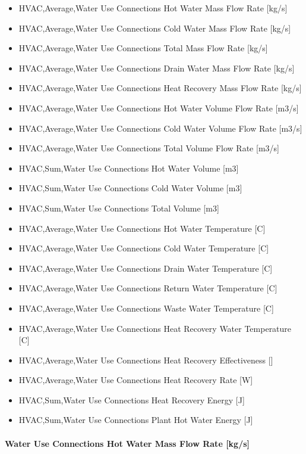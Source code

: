 \begin{itemize}
\item
  HVAC,Average,Water Use Connections Hot Water Mass Flow Rate {[}kg/s{]}
\item
  HVAC,Average,Water Use Connections Cold Water Mass Flow Rate {[}kg/s{]}
\item
  HVAC,Average,Water Use Connections Total Mass Flow Rate {[}kg/s{]}
\item
  HVAC,Average,Water Use Connections Drain Water Mass Flow Rate {[}kg/s{]}
\item
  HVAC,Average,Water Use Connections Heat Recovery Mass Flow Rate {[}kg/s{]}
\item
  HVAC,Average,Water Use Connections Hot Water Volume Flow Rate {[}m3/s{]}
\item
  HVAC,Average,Water Use Connections Cold Water Volume Flow Rate {[}m3/s{]}
\item
  HVAC,Average,Water Use Connections Total Volume Flow Rate {[}m3/s{]}
\item
  HVAC,Sum,Water Use Connections Hot Water Volume {[}m3{]}
\item
  HVAC,Sum,Water Use Connections Cold Water Volume {[}m3{]}
\item
  HVAC,Sum,Water Use Connections Total Volume {[}m3{]}
\item
  HVAC,Average,Water Use Connections Hot Water Temperature {[}C{]}
\item
  HVAC,Average,Water Use Connections Cold Water Temperature {[}C{]}
\item
  HVAC,Average,Water Use Connections Drain Water Temperature {[}C{]}
\item
  HVAC,Average,Water Use Connections Return Water Temperature {[}C{]}
\item
  HVAC,Average,Water Use Connections Waste Water Temperature {[}C{]}
\item
  HVAC,Average,Water Use Connections Heat Recovery Water Temperature {[}C{]}
\item
  HVAC,Average,Water Use Connections Heat Recovery Effectiveness {[]}
\item
  HVAC,Average,Water Use Connections Heat Recovery Rate {[}W{]}
\item
  HVAC,Sum,Water Use Connections Heat Recovery Energy {[}J{]}
\item
  HVAC,Sum,Water Use Connections Plant Hot Water Energy {[}J{]}
\end{itemize}

\paragraph{Water Use Connections Hot Water Mass Flow Rate {[}kg/s{]}}\label{water-use-connections-hot-water-mass-flow-rate-kgs}

